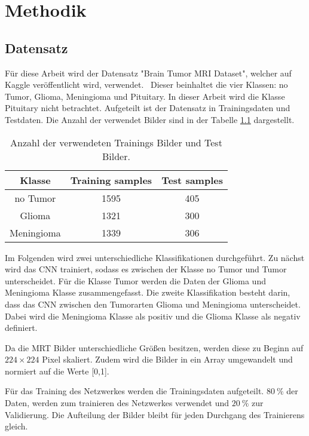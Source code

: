 \chapter{Methodik}
\section{Datensatz}
Für diese Arbeit wird der Datensatz "Brain Tumor MRI Dataset", welcher auf Kaggle veröffentlicht wird, verwendet.~\cite{msoud_nickparvar_2021}
Dieser beinhaltet die vier Klassen: no Tumor, Glioma, Meningioma und Pituitary.
In dieser Arbeit wird die Klasse Pituitary nicht betrachtet.
Aufgeteilt ist der Datensatz in Trainingsdaten und Testdaten.
Die Anzahl der verwendet Bilder sind in der Tabelle \ref{tab:daten} dargestellt. 
\begin{table}[H]
    \centering
    \begin{tabular}{c c c}
        \toprule
        Klasse      & Training samples & Test samples \\
        \midrule
        no Tumor    &    1595          & 405 \\
        Glioma      &    1321          & 300 \\
        Meningioma  &    1339          & 306 \\
        \bottomrule
  \end{tabular}
  \caption{Anzahl der verwendeten Trainings Bilder und Test Bilder.}
  \label{tab:daten}
\end{table}
\vspace{-2em}
Im Folgenden wird zwei unterschiedliche Klassifikationen durchgeführt.
Zu nächst wird das CNN trainiert, sodass es zwischen der Klasse no Tumor und Tumor unterscheidet. Für die Klasse Tumor
werden die Daten der Glioma und Meningioma Klasse zusammengefasst.
Die zweite Klassifikation besteht darin, dass das CNN zwischen den Tumorarten Glioma und Meningioma unterscheidet.
Dabei wird die Meningioma Klasse als positiv und die Glioma Klasse als negativ definiert.

Da die MRT Bilder unterschiedliche Größen besitzen, werden diese zu Beginn auf $224 \times 224$ Pixel skaliert.
Zudem wird die Bilder in ein Array umgewandelt und normiert auf die Werte [0,1].

Für das Training des Netzwerkes werden die Trainingsdaten aufgeteilt. $\qty{80}{\%}$ der Daten, werden zum trainieren des Netzwerkes 
verwendet und $\qty{20}{\%}$ zur Validierung.
Die Aufteilung der Bilder bleibt für jeden Durchgang des Trainierens gleich.


